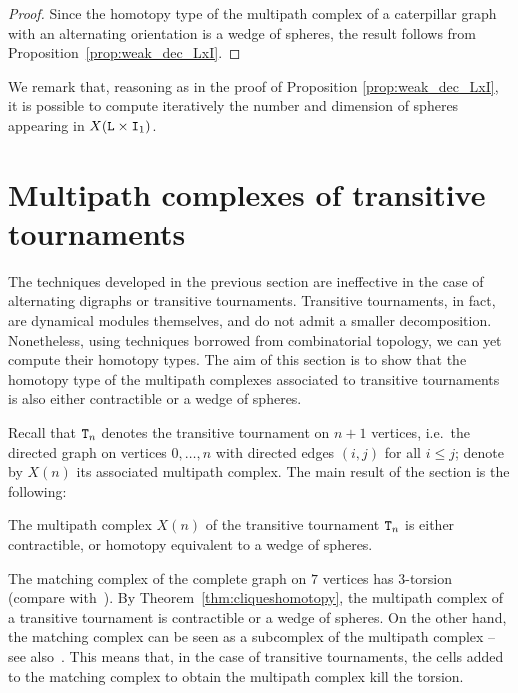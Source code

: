 \documentclass{amsart}
\begin{document}
\begin{proof}
Since the homotopy type of the multipath complex of a caterpillar graph with an alternating orientation is a wedge of spheres, the result follows from Proposition~\ref{prop:weak_dec_LxI}. 
\end{proof}

We remark that, reasoning as in the proof of Proposition \ref{prop:weak_dec_LxI}, it is possible to compute iteratively the number and dimension of spheres appearing in $X({\tt L}\times {\tt I}_1)$.

\section{Multipath complexes of transitive tournaments}

The techniques developed in the previous section are ineffective in the case of alternating digraphs or transitive tournaments. Transitive tournaments, in fact, are dynamical modules themselves, and do not admit a smaller decomposition. Nonetheless, using techniques borrowed from combinatorial topology, we can yet compute their homotopy types. The aim of this section is to show that the homotopy type of the multipath complexes associated to transitive tournaments is also either contractible or a wedge of spheres.


Recall that  ${\tt T}_n$ denotes the transitive tournament on  $n+1$ vertices, i.e.~the directed graph on vertices $0,\dots,n$  with directed  edges $(i,j)$ for all $i\leq j$; denote by $X(n)$ its associated multipath complex. The main result of the section is the following:

\begin{thm}\label{thm:cliqueshomotopy}
The multipath complex $X(n)$ of the transitive tournament ${\tt T}_n$ is either contractible, or homotopy equivalent to a wedge of spheres.
\end{thm}


\begin{rem}\label{rem:torsion}
The matching complex of the complete graph on $7$ vertices has $3$-torsion \cite{Bouc} (compare with~\cite[Theorem~1.3 and Remark~1.4]{torsion}). By Theorem~\ref{thm:cliqueshomotopy}, the multipath complex of a transitive tournament is contractible or a wedge of spheres. On the other hand, the matching complex can be seen as a subcomplex of the multipath complex -- see also~\cite[Section~4]{SpriSecondo}. This means that, in the case of transitive tournaments, the cells added to the matching complex to obtain the multipath complex kill the torsion.
\end{rem}
\end{document}
